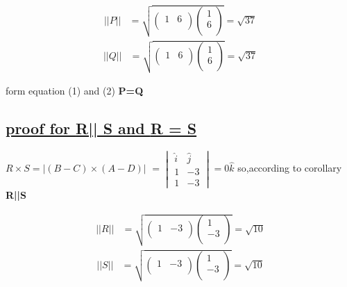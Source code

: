 \documentclass[journal,12pt,twocolumn]{IEEEtran}
\begin{document}
\boldmath
\begin{align}
||P|| &= \sqrt{\begin{pmatrix}1 & 6 \\ \end{pmatrix}\begin{pmatrix}1 \\ 6 \\ \end{pmatrix}}=\sqrt{37}
\end{align}
\begin{align}
||Q|| &= \sqrt{\begin{pmatrix}1 & 6 \\ \end{pmatrix}\begin{pmatrix}1 \\ 6 \\ \end{pmatrix}}=\sqrt{37}
\end{align}
\unboldmath


form equation (1) and (2) \textbf{P=Q}

\subsection{\underline{proof for  \textbf{R|| S} and \textbf{R = S}}}
\boldmath
$R\times S=|(B-C)\times (A-D)|$
$ = \begin{vmatrix}
           \hat{i} & \hat{j}\\
            1 & -3\\
            1 & -3
    \end{vmatrix} = {0\hat{k}}  $
\unboldmath
\vspace{0.3cm}
so,according to corollary  \textbf{R||S}

\boldmath
\begin{align}
||R|| &= \sqrt{\begin{pmatrix}1 & -3 \\ \end{pmatrix}\begin{pmatrix}1 \\ -3 \\ \end{pmatrix}}=\sqrt{10}
\end{align}
\begin{align}
||S|| &= \sqrt{\begin{pmatrix}1 & -3 \\ \end{pmatrix}\begin{pmatrix}1 \\ -3 \\ \end{pmatrix}}=\sqrt{10}
\end{align}
\unboldmath
\end{document}
